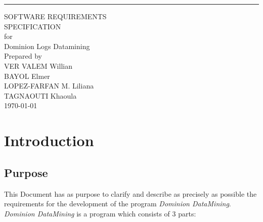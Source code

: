 \documentclass{scrreprt}
\date{}
\begin{document}
\begin{flushright}
    \rule{16cm}{5pt}\vskip1cm
    \begin{bfseries}
        \Huge{SOFTWARE REQUIREMENTS\\ SPECIFICATION}\\
        \vspace{1.9cm}
        for\\
        \vspace{1.9cm}
        Dominion Logs Datamining\\
        \vspace{1.9cm}
        Prepared by \\ VER VALEM Willian \\ BAYOL Elmer \\ LOPEZ-FARFAN M. Liliana
        \\ TAGNAOUTI Khaoula\\
        \vspace{1.9cm}
        \today\\
    \end{bfseries}
\end{flushright}

\tableofcontents




\chapter{Introduction}

\section{Purpose}
This Document has as purpose to clarify and describe as precisely as possible the
requirements for the development of the program \textit{Dominion DataMining}.\\
\textit{Dominion DataMining} is a program which consists of 3 parts:
\end{document}

